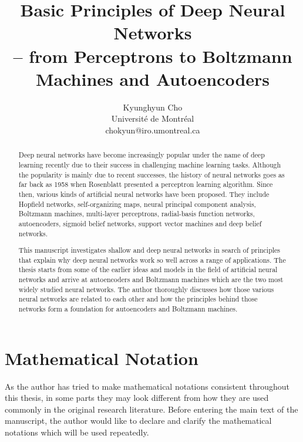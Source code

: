 \documentclass{now}
\title{Basic Principles of Deep Neural Networks \\ -- from Perceptrons to Boltzmann
Machines and Autoencoders}
\author{
    Kyunghyun Cho \\
    Universit\'e de Montr\'eal \\
    chokyun@iro.umontreal.ca \\
}
\begin{document}

\frontmatter

\maketitle

\tableofcontents

\mainmatter

\begin{abstract}
Deep neural networks have become increasingly popular under the name of deep
learning recently due to their success in challenging machine learning tasks.
Although the popularity is mainly due to recent successes, the history of neural
networks goes as far back as 1958 when Rosenblatt presented a perceptron
learning algorithm.  Since then, various kinds of artificial neural networks
have been proposed. They include Hopfield networks, self-organizing maps, neural
principal component analysis, Boltzmann machines, multi-layer perceptrons,
radial-basis function networks, autoencoders, sigmoid belief networks, support
vector machines and deep belief networks.

This manuscript investigates shallow and deep neural networks in search of
principles that explain why deep neural networks work so well across a range of
applications.  The thesis starts from some of the earlier ideas and models in
the field of artificial neural networks and arrive at autoencoders and Boltzmann
machines which are the two most widely studied neural networks. The author
thoroughly discusses how those various neural networks are related to each other
and how the principles behind those networks form a foundation for autoencoders
and Boltzmann machines. 
\end{abstract}

\renewcommand{\nomname}{List of Abbreviations}
%
\setlength{\nomitemsep}{-\parsep}
\printnomenclature[5em]


\chapter*{Mathematical Notation}
%

As the author has tried to make mathematical notations consistent throughout
this thesis, in some parts they may look different from how they are used
commonly in the original research literature. Before entering the main text of
the manuscript, the author would like to declare and clarify the mathematical
notations which will be used repeatedly.
\end{document}

